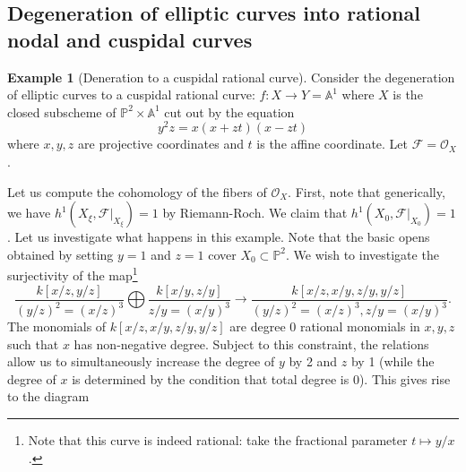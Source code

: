 \documentclass[10pt]{article}
\theoremstyle{definition}
\newtheorem{exmp}[thm]{Example}
\newcommand{\PP}{\mathbb{P}}
\newcommand{\OO}{\mathcal{O}}
\begin{document}
\subsection{Degeneration of elliptic curves into rational nodal and cuspidal curves}


\begin{exmp}[Deneration to a cuspidal rational curve]
Consider the degeneration of elliptic curves to a cuspidal rational curve: $f: X \rightarrow Y = \mathbb{A}^1$ where $X$ is the closed subscheme of $\PP^2 \times \mathbb{A}^1$ cut out by the equation 
$$y^2z = x(x+zt)(x-zt)$$
 where $x,y,z$ are projective coordinates and $t$ is the affine coordinate.  Let $\mathcal{F} = \OO_X$.


Let us compute the cohomology of the fibers of $\OO_X$.  First, note that generically, we have $h^1(X_\xi, \mathcal{F}|_{X_\xi}) = 1$ by Riemann-Roch.  We claim that $h^1(X_0, \mathcal{F}|_{X_0}) = 1$.  Let us investigate what happens in this example.  Note that the basic opens obtained by setting $y = 1$ and $z = 1$ cover $X_0 \subset \PP^2$.  We wish to investigate the surjectivity of the map\footnote{Note that this curve is indeed rational: take the fractional parameter $t \mapsto y/x$.}
$$\frac{k[x/z, y/z]}{(y/z)^2 = (x/z)^3} \bigoplus \frac{k[x/y, z/y]}{z/y = (x/y)^3} \rightarrow \frac{k[x/z,x/y,z/y, y/z]}{(y/z)^2 = (x/z)^3, z/y = (x/y)^3}.$$
The monomials of $k[x/z, x/y, z/y, y/z]$ are degree 0 rational monomials in $x, y, z$ such that $x$ has non-negative degree.  Subject to this constraint, the relations allow us to simultaneously increase the degree of $y$ by 2 and $z$ by 1 (while the degree of $x$ is determined by the condition that total degree is 0).  This gives rise to the diagram
\begin{center}
\end{center}
\end{exmp}
\end{document}
